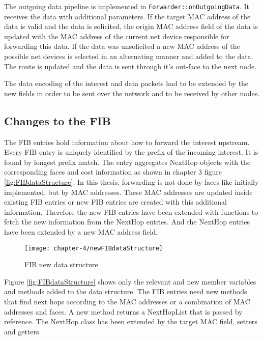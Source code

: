 The outgoing data pipeline is implemented in \texttt{Forwarder::onOutgoingData}. It receives the data with additional parameters. If the target MAC address of the data is valid and the data is solicited, the origin MAC address field of the data is updated with the MAC address of the current net device responsible for forwarding this data. If the data was unsolicited a new MAC address of the possible net devices is selected in an alternating manner and added to the data. The route is updated and the data is sent through it's out-face to the next node.

The data encoding of the interest and data packets had to be extended by the new fields in order to be sent over the network and to be received by other nodes.

\subsection{Changes to the FIB}

The FIB entries hold information about how to forward the interest upstream. Every FIB entry is uniquely identified by the prefix of the incoming interest. It is found by longest prefix match. The entry aggregates NextHop objects with the corresponding faces and cost information as shown in chapter 3 figure \ref{fig:FIBdataStructure}.
In this thesis, forwarding is not done by faces like initially implemented, but by MAC addresses. These MAC addresses are updated inside existing FIB entries or new FIB entries are created with this additional information. Therefore the new FIB entries have been extended with functions to fetch the new information from the NextHop entries. And the NextHop entries have been extended by a new MAC address field.

\begin{figure}[H]
  \centering
  \texttt{[image: chapter-4/newFIBdataStructure]}
  \caption{FIB new data structure}
  \label{fig:newFIBdataStructure}
\end{figure}

Figure \ref{fig:FIBdataStructure} shows only the relevant and new member variables and methods added to the data structure. The FIB entries need new methods that find next hops according to the MAC addresses or a combination of MAC addresses and faces. A new method returns a NextHopList that is passed by reference. The NextHop class has been extended by the target MAC field, setters and getters.

\newpage

